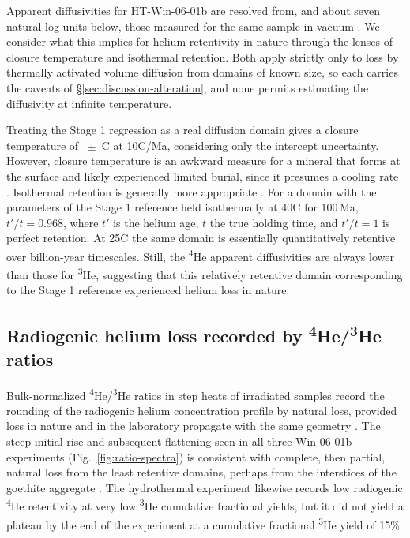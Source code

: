 Apparent diffusivities for HT-Win-06-01b are resolved from, and about seven natural log units below, those measured for the same sample in vacuum \citep{monteiro2017,farley2024}. We consider what this implies for helium retentivity in nature through the lenses of closure temperature and isothermal retention. Both apply strictly only to loss by thermally activated volume diffusion from domains of known size, so each carries the caveats of \S\ref{sec:discussion-alteration}, and none permits estimating the diffusivity at infinite temperature.

Treating the Stage 1 regression as a real diffusion domain gives a closure temperature of \ChTwoTc\ $\pm$ \ChTwoTcErr\,\textdegree C at 10\textdegree C/Ma, considering only the intercept uncertainty. However, closure temperature is an awkward measure for a mineral that forms at the surface and likely experienced limited burial, since it presumes a cooling rate \citep{dodson1973}. Isothermal retention is generally more appropriate \citep{wolf1998}. For a domain with the parameters of the Stage 1 reference held isothermally at 40\textdegree C for 100\,Ma, $t'/t = 0.968$, where $t'$ is the helium age, $t$ the true holding time, and $t'/t = 1$ is perfect retention. At 25\textdegree C the same domain is essentially quantitatively retentive over billion-year timescales. Still, the \textsuperscript{4}He apparent diffusivities are always lower than those for \textsuperscript{3}He, suggesting that this relatively retentive domain corresponding to the Stage 1 reference experienced helium loss in nature.

\subsection{Radiogenic helium loss recorded by \textsuperscript{4}He/\textsuperscript{3}He ratios}\label{sec:discussion-ratios}

Bulk-normalized \textsuperscript{4}He/\textsuperscript{3}He ratios in step heats of irradiated samples record the rounding of the radiogenic helium concentration profile by natural loss, provided loss in nature and in the laboratory propagate with the same geometry \citep{shusterfarley2004,farley2024}. The steep initial rise and subsequent flattening seen in all three Win-06-01b experiments (Fig.~\ref{fig:ratio-spectra}) is consistent with complete, then partial, natural loss from the least retentive domains, perhaps from the interstices of the goethite aggregate \citep{shustervasconcelos2005}. The hydrothermal experiment likewise records low radiogenic \textsuperscript{4}He retentivity at very low \textsuperscript{3}He cumulative fractional yields, but it did not yield a plateau by the end of the experiment at a cumulative fractional \textsuperscript{3}He yield of 15\%.

